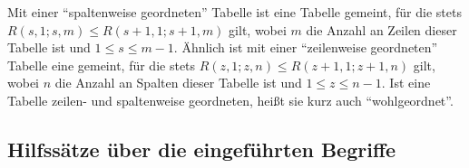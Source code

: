 \begin{definition}
    Mit einer "`spaltenweise geordneten"' Tabelle ist eine Tabelle gemeint, für die stets $R(s, 1; s, m)\leq 
    R(s+1, 1; s+1, m)$ gilt, wobei $m$ die Anzahl an Zeilen dieser Tabelle ist und $1\leq s\leq m-1$. Ähnlich ist 
    mit einer "`zeilenweise geordneten"' Tabelle eine gemeint, für die stets $R(z, 1; z, n)\leq R(z+1, 1; z+1, n)$ 
    gilt, wobei $n$ die Anzahl an Spalten dieser Tabelle ist und $1\leq z\leq n-1$. Ist eine Tabelle zeilen- und 
    spaltenweise geordneten, heißt sie kurz auch "`wohlgeordnet"'.
\end{definition}

\subsection*{Hilfssätze über die eingeführten Begriffe}

\renewcommand{\qedsymbol}{$\square$}

